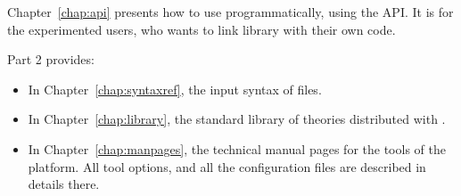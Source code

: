 
Chapter~\ref{chap:api} presents how to use \why programmatically,
using the API.  It is for the experimented users, who wants to link
\why library with their own code.

Part 2 provides: 
\begin{itemize}
\item In Chapter~\ref{chap:syntaxref}, the input syntax of files.
\item In Chapter~\ref{chap:library}, the standard library of
  theories distributed with \why.
\item In Chapter~\ref{chap:manpages}, the technical manual pages for the
  tools of the platform. All tool options, and all the configuration
  files are described in details there.
\end{itemize}


